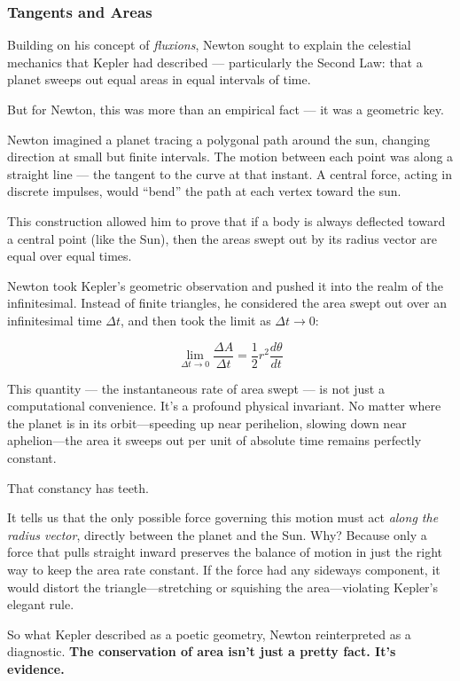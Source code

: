 \subsubsection{Tangents and Areas} 

Building on his concept of \textit{fluxions}, Newton sought to explain the celestial mechanics that Kepler had described — particularly the Second Law: that a planet sweeps out equal areas in equal intervals of time.

But for Newton, this was more than an empirical fact — it was a geometric key.

Newton imagined a planet tracing a polygonal path around the sun, changing direction at small but finite intervals. The motion between each point was along a straight line — the tangent to the curve at that instant. A central force, acting in discrete impulses, would “bend” the path at each vertex toward the sun.

This construction allowed him to prove that if a body is always deflected toward a central point (like the Sun), then the areas swept out by its radius vector are equal over equal times.

Newton took Kepler’s geometric observation and pushed it into the realm of the infinitesimal. Instead of finite triangles, he considered the area swept out over an infinitesimal time \( \Delta t \), and then took the limit as \( \Delta t \to 0 \):

\[
\lim_{\Delta t \to 0} \frac{\Delta A}{\Delta t} = \frac{1}{2} r^2 \frac{d\theta}{dt}
\]

This quantity — the instantaneous rate of area swept — is not just a computational convenience. It’s a profound physical invariant. No matter where the planet is in its orbit—speeding up near perihelion, slowing down near aphelion—the area it sweeps out per unit of absolute time remains perfectly constant.

That constancy has teeth.

It tells us that the only possible force governing this motion must act \textit{along the radius vector}, directly between the planet and the Sun. Why? Because only a force that pulls straight inward preserves the balance of motion in just the right way to keep the area rate constant. If the force had any sideways component, it would distort the triangle—stretching or squishing the area—violating Kepler’s elegant rule.

So what Kepler described as a poetic geometry, Newton reinterpreted as a diagnostic.
\textbf{The conservation of area isn’t just a pretty fact. It’s evidence.}

